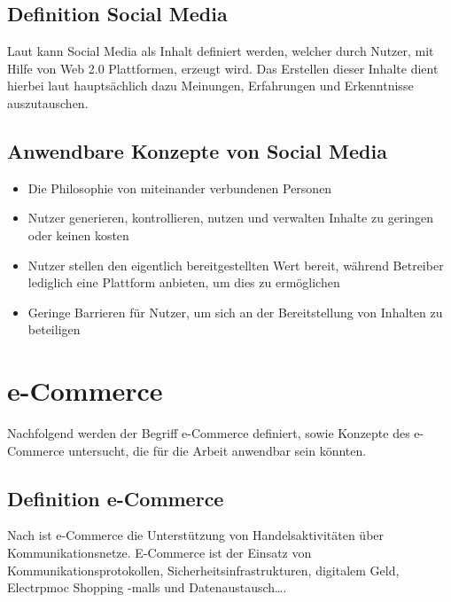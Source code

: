 \subsection{Definition Social Media}

Laut \textcite[S. 8]{turban:sc} kann Social Media als Inhalt definiert werden, welcher durch Nutzer, mit Hilfe von Web 2.0 Plattformen, erzeugt wird. Das Erstellen dieser Inhalte dient hierbei laut \textcite[S. 8]{turban:sc} hauptsächlich dazu Meinungen, Erfahrungen und Erkenntnisse auszutauschen.


\subsection{Anwendbare Konzepte von Social Media}

\begin{itemize}
\item Die Philosophie von miteinander verbundenen Personen \parencite[S. 8]{turban:sc}
\item Nutzer generieren, kontrollieren, nutzen und verwalten Inhalte zu geringen
oder keinen kosten \parencite[S. 8]{turban:sc}
\item Nutzer stellen den eigentlich bereitgestellten Wert bereit, während Betreiber lediglich eine Plattform anbieten, um dies zu ermöglichen  \parencite[S. 8]{turban:sc}
\item Geringe Barrieren für Nutzer, um sich an der Bereitstellung von Inhalten zu beteiligen \parencite[S. 8]{turban:sc}
\end{itemize}


\section{e-Commerce}

Nachfolgend werden der Begriff e-Commerce definiert, sowie Konzepte des e-Commerce untersucht, die für die Arbeit anwendbar sein könnten.


\subsection{Definition  e-Commerce}

Nach \textcite[S. 20]{merz:e-commerce} ist e-Commerce  \glqq die Unterstützung von Handelsaktivitäten über Kommunikationsnetze\grqq. E-Commerce ist der Einsatz von Kommunikationsprotokollen, Sicherheitsinfrastrukturen, digitalem Geld, Electrpmoc Shopping -malls und Datenaustausch….\grqq



